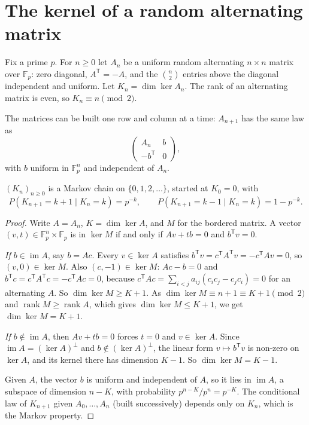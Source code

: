 \section{The kernel of a random alternating matrix}

Fix a prime $p$. For $n\ge0$ let $A_n$ be a uniform random alternating $n\times n$ matrix over $\mathbb F_p$: zero diagonal, $A^{\mathsf T}=-A$, and the $\binom n2$ entries above the diagonal independent and uniform. Let $K_n=\dim\ker A_n$. The rank of an alternating matrix is even, so $K_n\equiv n\pmod2$.

The matrices can be built one row and column at a time: $A_{n+1}$ has the same law as
\[
\begin{pmatrix}A_n&b\\-b^{\mathsf T}&0\end{pmatrix},
\]
with $b$ uniform in $\mathbb F_p^n$ and independent of $A_n$.

\begin{lemma}\label{lem:altchain}
$(K_n)_{n\ge0}$ is a Markov chain on $\{0,1,2,\dots\}$, started at $K_0=0$, with
\[
P(K_{n+1}=k+1\mid K_n=k)=p^{-k},\qquad P(K_{n+1}=k-1\mid K_n=k)=1-p^{-k}.
\]
\end{lemma}
\begin{proof}
Write $A=A_n$, $K=\dim\ker A$, and $M$ for the bordered matrix. A vector $(v,t)\in\mathbb F_p^n\times\mathbb F_p$ is in $\ker M$ if and only if $Av+tb=0$ and $b^{\mathsf T}v=0$.

\emph{If $b\in\operatorname{im}A$}, say $b=Ac$. Every $v\in\ker A$ satisfies $b^{\mathsf T}v=c^{\mathsf T}A^{\mathsf T}v=-c^{\mathsf T}Av=0$, so $(v,0)\in\ker M$. Also $(c,-1)\in\ker M$: $Ac-b=0$ and $b^{\mathsf T}c=c^{\mathsf T}A^{\mathsf T}c=-c^{\mathsf T}Ac=0$, because $c^{\mathsf T}Ac=\sum_{i<j}a_{ij}(c_ic_j-c_jc_i)=0$ for an alternating $A$. So $\dim\ker M\ge K+1$. As $\dim\ker M\equiv n+1\equiv K+1\pmod2$ and $\operatorname{rank}M\ge\operatorname{rank}A$, which gives $\dim\ker M\le K+1$, we get $\dim\ker M=K+1$.

\emph{If $b\notin\operatorname{im}A$}, then $Av+tb=0$ forces $t=0$ and $v\in\ker A$. Since $\operatorname{im}A=(\ker A)^\perp$ and $b\notin(\ker A)^\perp$, the linear form $v\mapsto b^{\mathsf T}v$ is non-zero on $\ker A$, and its kernel there has dimension $K-1$. So $\dim\ker M=K-1$.

Given $A$, the vector $b$ is uniform and independent of $A$, so it lies in $\operatorname{im}A$, a subspace of dimension $n-K$, with probability $p^{n-K}/p^n=p^{-K}$. The conditional law of $K_{n+1}$ given $A_0,\dots,A_n$ (built successively) depends only on $K_n$, which is the Markov property.
\end{proof}

